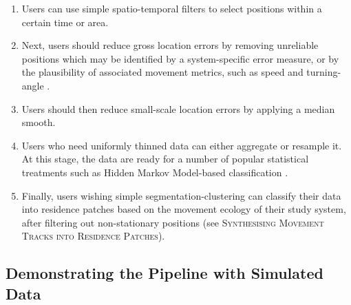 \documentclass[10pt,paper=a4,headings=standardclasses
]{scrartcl}
\begin{document}
\begin{enumerate}
    
    
    
    \item Users can use simple spatio-temporal filters to select positions within a certain time or area.
    \item Next, users should reduce gross location errors by removing unreliable positions which may be identified by a system-specific error measure, or by the plausibility of associated movement metrics, such as speed and turning-angle \citep{seidel2018, calenge2009}.
    \item Users should then reduce small-scale location errors by applying a median smooth.
    \item Users who need uniformly thinned data can either aggregate or resample it.
    At this stage, the data are ready for a number of popular statistical treatments such as Hidden Markov Model-based classification \citep{michelot2016,langrock2012}.
    \item Finally, users wishing simple segmentation-clustering can classify their data into residence patches based on the movement ecology of their study system, after filtering out non-stationary positions (see \textsc{Synthesising Movement Tracks into Residence Patches}).
    
\end{enumerate}

\subsection{Demonstrating the Pipeline with Simulated Data}
\end{document}

